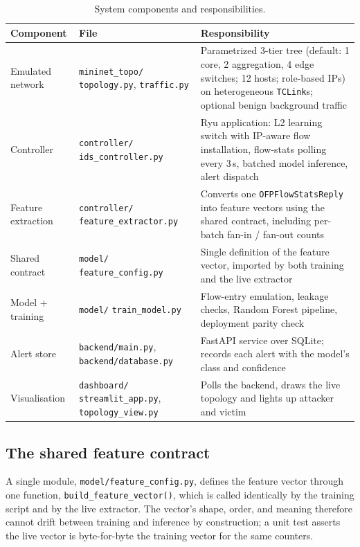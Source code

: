 \documentclass[11pt]{article}
\begin{document}
\begin{table}[h]
\centering
\caption{System components and responsibilities.}
\label{tab:components}
\small
\begin{tabular}{p{3.2cm}p{3.1cm}p{7.3cm}}
\toprule
Component & File & Responsibility \\
\midrule
Emulated network & \texttt{mininet\_topo/} \texttt{topology.py}, \texttt{traffic.py} &
Parametrized 3-tier tree (default: 1 core, 2 aggregation, 4 edge switches; 12 hosts;
role-based IPs) on heterogeneous \texttt{TCLink}s; optional benign background traffic \\
Controller & \texttt{controller/} \texttt{ids\_controller.py} & Ryu application: L2
learning switch with IP-aware flow installation, flow-stats polling every 3\,s, batched
model inference, alert dispatch \\
Feature extraction & \texttt{controller/} \texttt{feature\_extractor.py} & Converts one
\texttt{OFPFlowStatsReply} into feature vectors using the shared contract, including
per-batch fan-in / fan-out counts \\
Shared contract & \texttt{model/} \texttt{feature\_config.py} & Single definition of the
feature vector, imported by both training and the live extractor \\
Model + training & \texttt{model/} \texttt{train\_model.py} & Flow-entry emulation,
leakage checks, Random Forest pipeline, deployment parity check \\
Alert store & \texttt{backend/main.py}, \texttt{backend/database.py} & FastAPI service
over SQLite; records each alert with the model's class and confidence \\
Visualisation & \texttt{dashboard/} \texttt{streamlit\_app.py}, \texttt{topology\_view.py}
& Polls the backend, draws the live topology and lights up attacker and victim \\
\bottomrule
\end{tabular}
\end{table}

\subsection{The shared feature contract}
\label{sec:features}
A single module, \texttt{model/feature\_config.py}, defines the feature vector through one
function, \texttt{build\_feature\_vector()}, which is called identically by the training
script and by the live extractor. The vector's shape, order, and meaning therefore cannot
drift between training and inference by construction; a unit test asserts the live vector
is byte-for-byte the training vector for the same counters.
\end{document}
